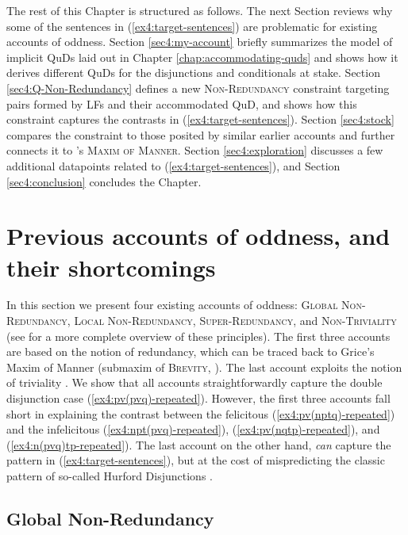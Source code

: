 The rest of this Chapter is structured as follows. The next Section reviews why some of the sentences in (\ref{ex4:target-sentences}) are problematic for existing accounts of oddness. Section \ref{sec4:my-account} briefly summarizes the model of implicit QuDs laid out in Chapter \ref{chap:accommodating-quds} and shows how it derives different QuDs for the disjunctions and conditionals at stake. Section \ref{sec4:Q-Non-Redundancy} defines a new \textsc{Non-Redundancy} constraint targeting pairs formed by LFs and their accommodated QuD, and shows how this constraint captures the contrasts in (\ref{ex4:target-sentences}). Section \ref{sec4:stock} compares the constraint to those posited by similar earlier accounts and further connects it to \citeauthor{Grice1975}'s  \textsc{Maxim of Manner}.
Section \ref{sec4:exploration} discusses a few additional datapoints related to (\ref{ex4:target-sentences}), and Section \ref{sec4:conclusion} concludes the Chapter.

\section{Previous accounts of oddness, and their shortcomings}\label{sec4:previous-accounts}

In this section we present four existing accounts of oddness: \textsc{Global Non-Redundancy}, \textsc{Local Non-Redundancy}, \textsc{Super-Redundancy}, and \textsc{Non-Triviality} (see  for a more complete overview of these principles). The first three accounts are based on the notion of redundancy, which can be traced back to Grice's Maxim of Manner (submaxim of \textsc{Brevity}, ). The last account exploits the notion of triviality \parencite{Stalnaker1974}. We show that all accounts straightforwardly capture the double disjunction case (\ref{ex4:pv(pvq)-repeated}). However, the first three accounts fall short in explaining the contrast between the felicitous (\ref{ex4:pv(nptq)-repeated}) and the infelicitous (\ref{ex4:npt(pvq)-repeated}), (\ref{ex4:pv(nqtp)-repeated}), and (\ref{ex4:n(pvq)tp-repeated}). The last account on the other hand, \textit{can} capture the pattern in (\ref{ex4:target-sentences}), but at the cost of mispredicting the classic pattern of so-called Hurford Disjunctions \parencite{Hurford1974}.

\subsection{Global Non-Redundancy}


